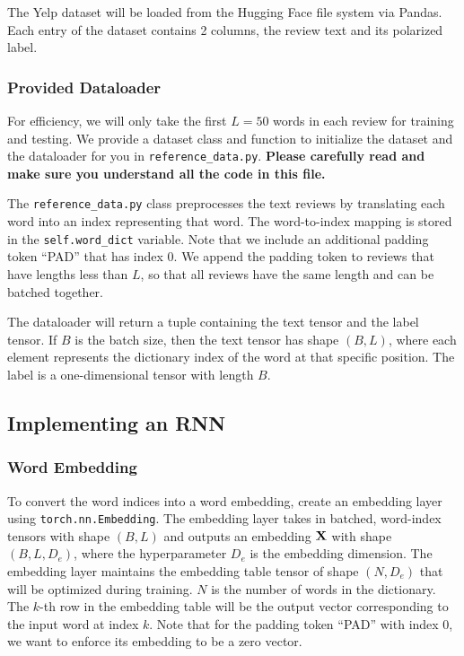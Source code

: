 The Yelp dataset will be loaded from the Hugging Face file system via Pandas. Each entry of the dataset contains 2 columns, the review text and its polarized label.

\subsubsection{Provided Dataloader}
For efficiency, we will only take the first $L=50$ words in each review for training and testing. We provide a dataset class and function to initialize the dataset and the dataloader for you in \texttt{reference\_data.py}. \textbf{Please carefully read and make sure you understand all the code in this file.}

The \texttt{reference\_data.py} class preprocesses the text reviews by translating each word into an index representing that word. The word-to-index mapping is stored in the \texttt{self.word\_dict} variable. Note that we include an additional padding token ``PAD'' that has index 0. We append the padding token to reviews that have lengths less than $L$, so that all reviews have the same length and can be batched together.

The dataloader will return a tuple containing the text tensor and the label tensor. If $B$ is the batch size, then the text tensor has shape $(B, L)$, where each element represents the dictionary index of the word at that specific position. The label is a one-dimensional tensor with length $B$.

\subsection{Implementing an RNN}

\subsubsection{Word Embedding} To convert the word indices into a word embedding, create an embedding layer using \texttt{torch.nn.Embedding}. The embedding layer takes in batched, word-index tensors with shape $(B, L)$ and outputs an embedding $\mathbf{X}$ with shape $(B, L, D_e)$, where the hyperparameter $D_e$ is the embedding dimension. The embedding layer maintains the embedding table tensor of shape $(N, D_e)$ that will be optimized during training. $N$ is the number of words in the dictionary. The $k$-th row in the embedding table will be the output vector corresponding to the input word at index $k$. Note that for the padding token ``PAD'' with index 0, we want to enforce its embedding to be a zero vector. %

